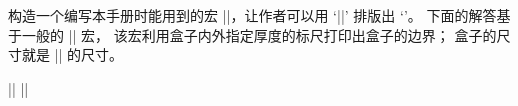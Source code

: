 \ddangerexercise 构造一个编写本手册时能用到的宏 |\demobox|，让作者可以用%
`||' 排版出 `\thinspace{}\thinspace'。
\answer 下面的解答基于一般的 |\makeblankbox| 宏，
该宏利用盒子内外指定厚度的标尺打印出盒子的边界；
盒子的尺寸就是 || 的尺寸。\par
|\def\dolist{\afterassignment\dodolist\let\next= }|\parbreak
|\def\dodolist{\ifx\next\endlist \let\next\relax|\parbreak
|  \else \\\let\next\dolist \fi|\parbreak
|  \next}|\par
